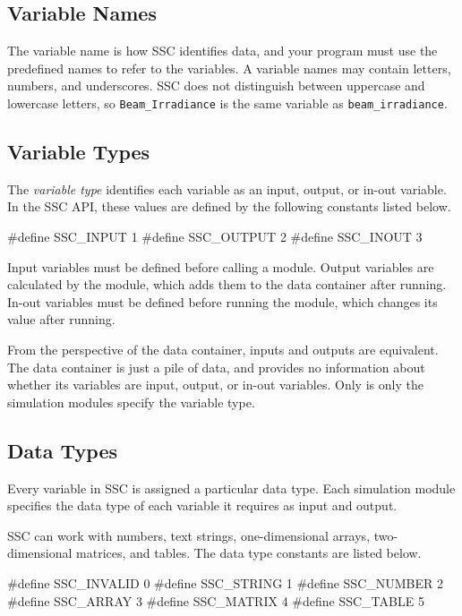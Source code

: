 \documentclass{scrartcl} %
\newcommand{\+}{\discretionary{\mbox{\scriptsize$\hookleftarrow$}}{}{}}
\begin{document}
\subsection{Variable Names}

The variable name is how SSC identifies data, and your program must use the predefined names to refer to the variables. A variable names may contain letters, numbers, and underscores. SSC does not distinguish between uppercase and lowercase letters, so \texttt{Beam\_Irradiance} is the same variable as \texttt{beam\_irradiance}.

\subsection{Variable Types}

The \emph{variable type} identifies each variable as an input, output, or in-out variable.  In the SSC API, these values are defined by the following constants listed below.

\begin{verbatimtab}
#define SSC_INPUT 1
#define SSC_OUTPUT 2
#define SSC_INOUT 3
\end{verbatimtab}

Input variables must be defined before calling a module. Output variables are calculated by the module, which adds them to the data container after running. In-out variables must be defined before running the module, which changes its value after running.

From the perspective of the data container, inputs and outputs are equivalent. The data container is just a pile of data, and provides no information about whether its variables are input, output, or in-out variables. Only is only the simulation modules specify the variable type.

\subsection{Data Types}

Every variable in SSC is assigned a particular data type. Each simulation module specifies the data type of each variable it requires as input and output.

SSC can work with numbers, text strings, one-dimensional arrays, two-dimensional matrices, and tables. The data type constants are listed below.

\begin{verbatimtab}
#define SSC_INVALID 0
#define SSC_STRING 1
#define SSC_NUMBER 2
#define SSC_ARRAY 3
#define SSC_MATRIX 4
#define SSC_TABLE 5
\end{verbatimtab}
\end{document}
